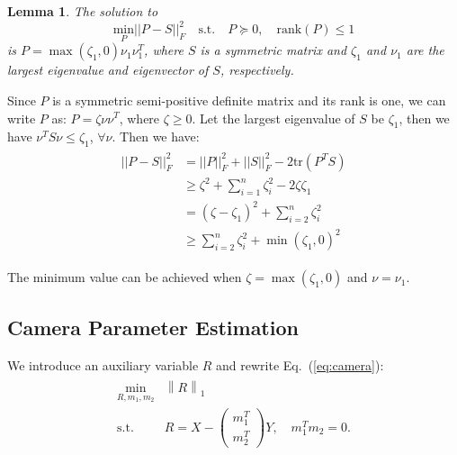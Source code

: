 \documentclass[10pt,twocolumn,letterpaper]{article}
\newtheorem{lemma}[theorem]{Lemma}
\newenvironment{proof}[1][Proof]{\begin{trivlist}
\item[\hskip \labelsep {\bfseries #1}]}{\end{trivlist}}
\begin{document}
\begin{lemma}
\label{lemma1} The solution to
\begin{equation}
\underset{P}{\text{min}} {||P-S||_F^2} \quad \text{s.t.} \quad P
\succeq 0, \quad \mbox{rank}(P) \leq 1 \label{eq:update_Y'}
\end{equation}
is $P=\max(\zeta_1,0) \nu_1 \nu_1^T$, where $S$ is a symmetric
matrix and $\zeta_1$ and $\nu_1$ are the largest eigenvalue and
eigenvector of $S$, respectively.
\end{lemma}

\begin{proof}
Since $P$ is a symmetric semi-positive definite matrix and its
rank is one, we can write $P$ as: $P=\zeta \nu \nu^T$, where
$\zeta \geq 0$. Let the largest eigenvalue of $S$ be $\zeta_1$,
then we have $\nu^T S \nu \leq \zeta_1$, $\forall \nu$. Then we
have:
\begin{eqnarray}
\begin{array}{rl}
||P-S||_F^2 &= ||P||_F^2 + ||S||_F^2 - 2 \mbox{tr}(P^TS) \\
& \geq \zeta^2 + \sum_{i=1}^n{\zeta_i^2}-2 \zeta \zeta_1 \\
&=(\zeta-\zeta_1)^2 + \sum_{i=2}^n{\zeta_i^2} \\
& \geq \sum_{i=2}^n{\zeta_i^2} +  \min(\zeta_1, 0)^2
\end{array}
\end{eqnarray}
\end{proof}
The minimum value can be achieved when $\zeta=\max(\zeta_1,0)$ and
$\nu=\nu_1$.


\subsection{Camera Parameter Estimation}
We introduce an auxiliary variable $R$ and rewrite
Eq.~(\ref{eq:camera}):
\begin{eqnarray}
\begin{array}{rl}
\underset{R,m_1,m_2}{\text{min}}
& {\left\|R\right\|_1} \\
\text{s.t.} & R=X-\left( \begin{array}{c}m_1^T \\ m_2^T
\end{array} \right) Y, \quad m_1^Tm_2=0.
\end{array}
\label{eq:camera_objective}
\end{eqnarray}
\end{document}
